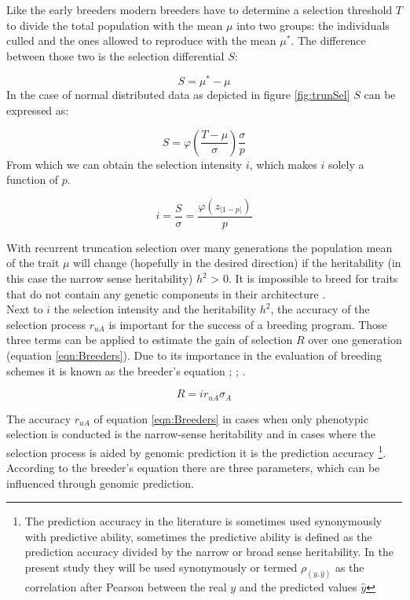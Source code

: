 Like the early breeders modern breeders have to determine a selection threshold $T$ to divide the
total population with the mean $\mu$ into two groups: the individuals culled and the ones allowed to
reproduce with the mean $\mu^{\ast}$. The difference between those two is the selection differential
$S$:

\begin{equation}
 S = \mu^{\ast} - \mu
\label{eqn:S}
\end{equation}
\noindent
In the case of normal distributed data as depicted in figure \ref{fig:trunSel} $S$ can be expressed as:

\begin{equation}
S = \varphi (\frac{T - \mu}{\sigma}) \frac{\sigma}{p}
\end{equation}
\noindent
From which we can obtain the selection intensity $i$, which makes $i$ solely a function of $p$.

\begin{equation}
i = \frac{S}{\sigma} = \frac{\varphi (z_{|1-p|})}{p}
\end{equation}

With recurrent truncation selection over many generations the population mean of the trait
$\mu$ will change (hopefully in the desired direction) if the heritability (in this case
the narrow sense heritability) $h^2$ > 0. It is impossible to breed for traits that do not
contain any genetic components in their architecture \cite{walsh2018}.\\
Next to $i$ the selection intensity and the heritability $h^2$, the accuracy of the selection process
$r_{uA}$ is important for the success of a breeding program. Those three terms can be
applied to estimate the gain of selection $R$ over one generation (equation
\ref{eqn:Breeders}). Due to its importance in the evaluation of breeding schemes it is
known as the breeder's equation \cite{mousseau1987natural}; \cite{falconer1996};
\cite{kingsolver2001strength}.

\begin{equation}
 R = i r_{uA} \sigma_A
\label{eqn:Breeders}
\end{equation}

The accuracy $r_{uA}$ of equation \ref{eqn:Breeders} in cases when only phenotypic
selection is conducted is the narrow-sense heritability and in cases where the selection
process is aided by genomic prediction it is the prediction accuracy \footnote{The
  prediction accuracy in the literature is sometimes used synonymously with predictive
  ability, sometimes the predictive ability is defined as the prediction accuracy divided
  by the narrow or broad sense heritability. In the present study they will be used
  synonymously or termed $\rho_{(y,\hat{y})}$ as the correlation after Pearson between the
  real $y$ and the predicted values $\hat{y}$}. According to the breeder's equation there
are three parameters, which can be influenced through genomic
prediction. \\

